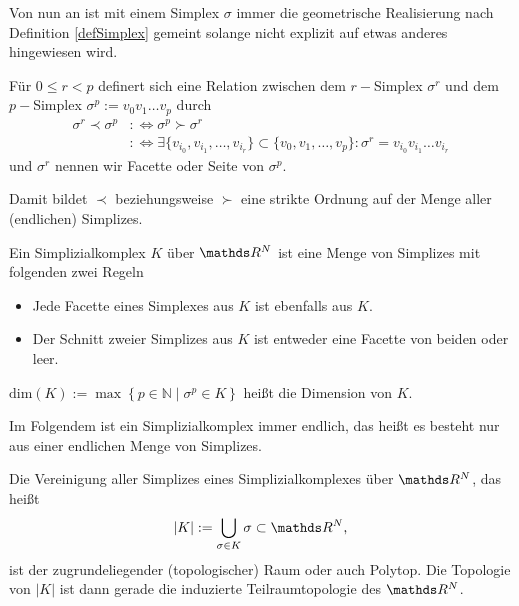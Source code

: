     Von nun an ist mit einem Simplex \( \sigma \) immer die geometrische Realisierung nach Definition \ref{defSimplex} gemeint solange nicht explizit auf
    etwas anderes hingewiesen wird.

    \begin{definition}
      Für \( 0 \le r < p \) definert sich eine Relation zwischen dem \( r- \)Simplex \(\sigma^{r}\) und dem \( p- \)Simplex \( \sigma^{p}:= v_{0} v_{1} \ldots v_{p} \) durch
      \begin{align}
        \sigma^{r} \prec \sigma^{p} &:\Leftrightarrow \sigma^{p} \succ \sigma^{r} \\
                                    &:\Leftrightarrow \exists \{ v_{i_{0}}, v_{i_{1}}, \ldots, v_{i_{r}} \} \subset \{ v_{0}, v_{1}, \ldots, v_{p}\} : \sigma^{r} = v_{i_{0}} v_{i_{1}} \ldots v_{i_{r}}
      \end{align}
      und \( \sigma^{r} \) nennen wir Facette oder Seite von \( \sigma^{p} \).
    \end{definition}
    
    Damit bildet \( \prec \) beziehungsweise \( \succ \) eine strikte Ordnung auf der Menge aller (endlichen) Simplizes.
    
    \begin{definition}
      Ein Simplizialkomplex \( K \) über \( \R^{N} \) ist eine Menge von Simplizes mit folgenden zwei Regeln
      \begin{itemize}
        \item Jede Facette eines Simplexes aus \( K \) ist ebenfalls aus \( K \).
        \item Der Schnitt zweier Simplizes aus \( K \) ist entweder eine Facette von beiden oder leer.
      \end{itemize}
      
      \( \text{dim}(K) := \max\left\{ p \in \mathds{N} \middle| \sigma^{p} \in K \right\} \)
      heißt die Dimension von \( K \).
    \end{definition}

    Im Folgendem ist ein Simplizialkomplex immer endlich, das heißt es besteht nur aus einer endlichen Menge von Simplizes.

    \begin{definition}
      Die Vereinigung aller Simplizes eines Simplizialkomplexes über \( \R^{N} \), das heißt
      \begin{align}
        |K| := \bigcup_{\sigma \in K} \sigma \subset \R^{N} \text{,}
      \end{align}
      ist der zugrundeliegender (topologischer) Raum oder auch Polytop.
      Die Topologie von \( |K| \) ist dann gerade die induzierte Teilraumtopologie des \( \R^{N} \).
    \end{definition}
    
